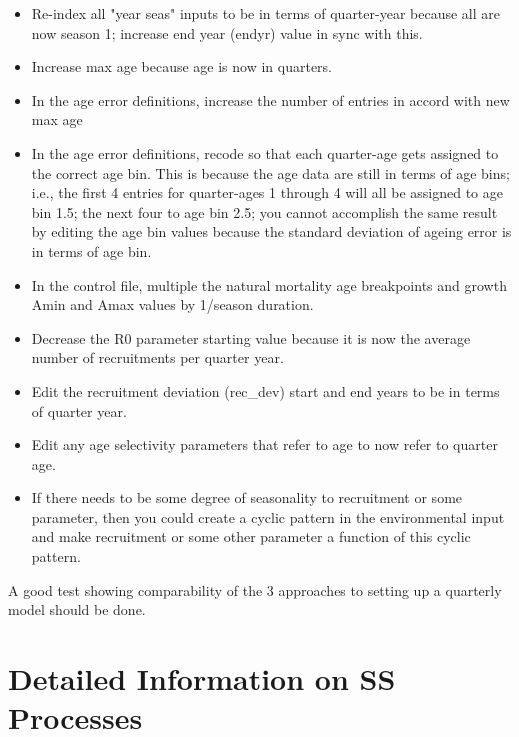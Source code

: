 \begin{itemize}
	\item Re-index all "year seas" inputs to be in terms of quarter-year because all are now season 1; increase end year (endyr) value in sync with this.
	\item Increase max age because age is now in quarters.
	\item In the age error definitions, increase the number of entries in accord with new max age
	\item In the age error definitions, recode so that each quarter-age gets assigned to the correct age bin. This is because the age data are still in terms of age bins; i.e., the first 4 entries for quarter-ages 1 through 4 will all be assigned to age bin 1.5; the next four to age bin 2.5;  you cannot accomplish the same result by editing the age bin values because the standard deviation of ageing error is in terms of age bin.
	\item In the control file, multiple the natural mortality age breakpoints and growth Amin and Amax values by 1/season duration.
	\item Decrease the R0 parameter starting value because it is now the average number of recruitments per quarter year.
	\item Edit the recruitment deviation (rec\_dev) start and end years to be in terms of quarter year.
	\item Edit any age selectivity parameters that refer to age to now refer to quarter age.
	\item If there needs to be some degree of seasonality to recruitment or some parameter, then you could create a cyclic pattern in the environmental input and make recruitment or some other parameter a function of this cyclic pattern.
\end{itemize}

A good test showing comparability of the 3 approaches to setting up a quarterly model should be done.

\pagebreak


\section{Detailed Information on SS Processes}

